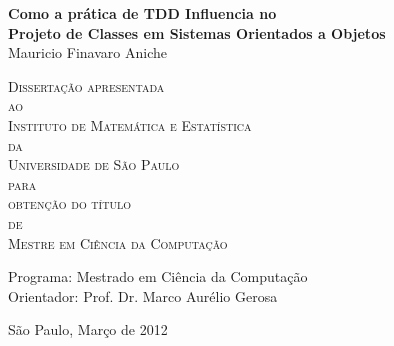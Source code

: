 \documentclass[11pt,openany,twoside,a4paper]{book}
\begin{document}
\frontmatter 
\fancyhead[RO]{{\footnotesize\rightmark}\hspace{2em}\thepage}
\setcounter{tocdepth}{2}
\fancyhead[LE]{\thepage\hspace{2em}\footnotesize{\leftmark}}
\fancyhead[RE,LO]{}
\fancyhead[RO]{{\footnotesize\rightmark}\hspace{2em}\thepage}

\onehalfspacing  %

\thispagestyle{empty}
\begin{center}
    \vspace*{2.3cm}
    \textbf{\Large{Como a prática de TDD Influencia no \\Projeto de Classes em Sistemas Orientados a Objetos}}\\
    
    \vspace*{1.2cm}
    \Large{Mauricio Finavaro Aniche}
    
    \vskip 2cm
    \textsc{
    Dissertação apresentada\\[-0.25cm] 
    ao\\[-0.25cm]
    Instituto de Matemática e Estatística\\[-0.25cm]
    da\\[-0.25cm]
    Universidade de São Paulo\\[-0.25cm]
    para\\[-0.25cm]
    obtenção do título\\[-0.25cm]
    de\\[-0.25cm]
    Mestre em Ciência da Computação}
    
    \vskip 1.5cm
    Programa: Mestrado em Ciência da Computação\\
    Orientador: Prof. Dr. Marco Aurélio Gerosa

   	\vskip 1.5cm
    \normalsize{São Paulo, Março de 2012}
\end{center}

\end{document}
